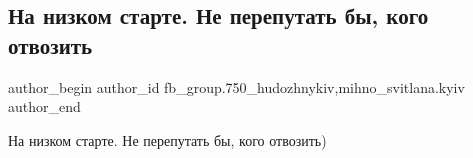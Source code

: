  
 
 
 
 

\subsection{На низком старте. Не перепутать бы, кого отвозить}
\label{sec:03_04_2018.fb.fb_group.750_hudozhnykiv.2.na_nizkom_starte_ne_pereputat_by_kogo_otvozit}
 
\ifcmt
 author_begin
   author_id fb_group.750_hudozhnykiv,mihno_svitlana.kyiv
 author_end
\fi

На низком старте. Не перепутать бы, кого отвозить)

